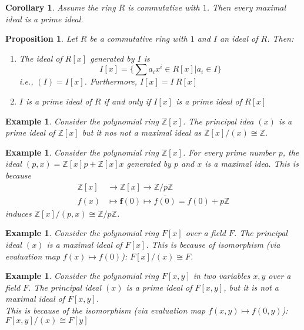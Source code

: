 \documentclass[a4paper,8pt]{article}
\newcommand{\f}{\mathbf{f}}
\theoremstyle{theorem}
\newtheorem{corollary}[theorem]{Corollary}
\newtheorem{proposition}[theorem]{Proposition}
\newtheorem{example}[theorem]{Example}
\begin{document}
\begin{corollary}
Assume the ring $R$ is commutative with $1$. Then every maximal ideal is a prime ideal.	
\end{corollary}


\begin{proposition}
Let $R$ be a commutative ring with $1$ and $I$ an ideal of $R$. Then:
\begin{enumerate}[label=(\roman*)]
\item The ideal of $R[x]$ generated by $I$ is
\begin{equation}
I[x] = \{\sum a_i x^i \in R[x] | a_i \in I \} \nonumber
\end{equation}
i.e., $(I) = I[x]$. Furthermore, $I[x] = I \ R[x]$
\item $I$ is a prime ideal of $R$ if and only if $I[x]$ is a prime ideal of $R[x]$
\end{enumerate}
\end{proposition}


\begin{example}
Consider the polynomial ring $\mathbb{Z}[x]$.
The principal idea $(x)$ is a prime ideal of $\mathbb{Z}[x]$ but it nos not a maximal ideal as $\mathbb{Z}[x]/(x) \cong \mathbb{Z}$.
\end{example}


\begin{example}
Consider the polynomial ring $\mathbb{Z}[x]$.
For every prime number $p$, the ideal $(p,x)=\mathbb{Z}[x]p + \mathbb{Z}[x]x$ generated by $p$ and $x$ is a maximal idea. This is because 
\begin{align}
\mathbb{Z}[x] &\rightarrow \mathbb{Z}[x] \rightarrow \mathbb{Z}/p\mathbb{Z} \nonumber \\
f(x) &\mapsto \f(0) \mapsto \overline{f(0)} = f(0) + p\mathbb{Z} \nonumber
\end{align}
induces $\mathbb{Z}[x]/(p,x) \cong \mathbb{Z}/p\mathbb{Z}$.
\end{example}


\begin{example}
Consider the polynomial ring $F[x]$ over a field $F$. The principal ideal $(x)$ is a maximal ideal of $F[x]$.
This is because of isomorphism (via evaluation map $f(x) \mapsto f(0)$): $F[x]/(x) \cong F$.
\end{example}


\begin{example}
Consider the polynomial ring $F[x,y]$ in two variables $x,y$ over a field $F$. The principal ideal $(x)$ is a prime ideal of $F[x,y]$, but it is not a maximal ideal of $F[x,y]$.\\
This is because of the isomorphism (via evaluation map $f(x,y) \mapsto f(0,y)$): $F[x,y]/(x) \cong F[y]$
\end{example}
\end{document}

